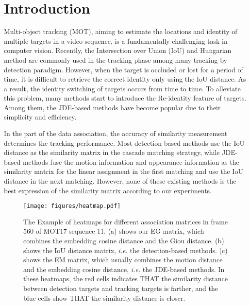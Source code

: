 \documentclass[runningheads]{llncs}
\begin{document}
\section{Introduction}
Multi-object tracking (MOT), aiming to estimate the locations and identity of multiple targets in a video sequence, is a fundamentally challenging task in computer vision\cite{vandenhende2021multi}. Recently, the Intersection over Union (IoU) and Hungarian method are commonly used in the tracking phase among many tracking-by-detection paradigm\cite{bewley2016simple,bochinski2017high,liu2020gsm,specker2021occlusion,tang2017multiple,wojke2017simple,xiao2018simple,xu2019spatial,zhang2021bytetrack}. However, when the target is occluded or lost for a period of time, it is difficult to retrieve the correct identity only using the IoU distance. As a result, the identity switching of targets occurs from time to time. To alleviate this problem, many methods start to introduce the Re-identity feature of targets. Among them, the JDE-based methods\cite{liang2020rethinking,liang2021one,lu2020retinatrack,pang2021quasi,wang2020towards,zhang2021voxeltrack,zhang2021fairmot} have become popular due to their simplicity and efficiency. 

In the part of the data association, the accuracy of similarity measurement determines the tracking performance. Most detection-based methods use the IoU distance as the similarity matrix in the cascade matching strategy, while JDE-based methods fuse the motion information and appearance information as the similarity matrix for the linear assignment in the first matching and use the IoU distance in the next matching. However, none of these existing methods is the best expression of the similarity matrix according to our experiments. 
\begin{figure}
\centering
\texttt{[image: figures/heatmap.pdf]}
\caption{The Example of heatmaps for different association matrices in frame 560 of MOT17 sequence 11. (a) shows our EG matrix, which combines the embedding cosine distance and the Giou distance. (b) shows the IoU distance matrix, \emph{i.e.} the detection-based methods. (c) shows the EM matrix, which usually combines the motion distance and the embedding cosine distance, \emph{i.e.} the JDE-based methods. In these heatmaps, the red cells indicates THAT the similarity distance between detection targets and tracking targets is farther, and the blue cells show THAT the similarity distance is closer.}
\label{fig:heatmap}
\end{figure}
\end{document}
